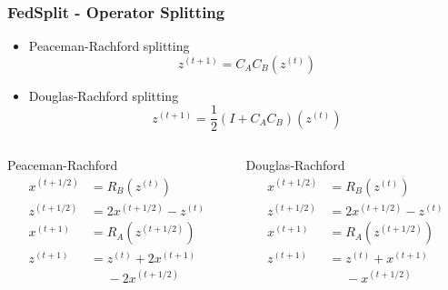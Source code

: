 \begin{frame}
\frametitle{FedSplit - Operator Splitting}

\begin{itemize}
    \item Peaceman-Rachford splitting
    $$z^{(t+1)} = C_A C_B(z^{(t)})$$
    \item Douglas-Rachford splitting
    $$z^{(t+1)} = \frac12(I + C_A C_B)(z^{(t)})$$
\end{itemize}

\vspace{-0.8em}

\begin{columns}
\begin{column}{0.4\textwidth}
\begin{block}{Peaceman-Rachford}
\ 
\vspace{-1.3em}
\begin{align*}
x^{(t+1/2)} & = R_B(z^{(t)}) \\
z^{(t+1/2)} & = 2x^{(t+1/2)} - z^{(t)} \\
x^{(t+1)} & = R_A(z^{(t+1/2)}) \\
z^{(t+1)} & = z^{(t)} + 2x^{(t+1)} \\
& \phantom{=} - 2x^{(t+1/2)}
\end{align*}
\end{block}
\end{column}
\begin{column}{0.4\textwidth}
\begin{block}{Douglas-Rachford}
\ 
\vspace{-1.3em}
\begin{align*}
x^{(t+1/2)} & = R_B(z^{(t)}) \\
z^{(t+1/2)} & = 2x^{(t+1/2)} - z^{(t)} \\
x^{(t+1)} & = R_A(z^{(t+1/2)}) \\
z^{(t+1)} & = z^{(t)} + x^{(t+1)} \\
& \phantom{=} - x^{(t+1/2)}
\end{align*}
\end{block}
\end{column}
\end{columns}

\end{frame}


